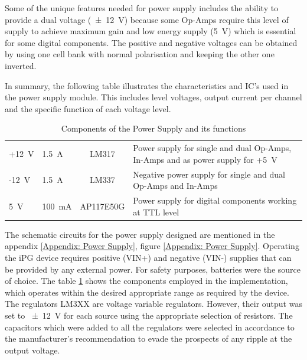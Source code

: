 Some of the unique features needed for power supply includes the ability to provide a dual voltage (\SI{\pm 12}{\volt}) because some Op-Amps require this level of supply to achieve maximum gain and low energy supply (\SI{5}{\volt}) which is essential for some digital components. The positive and negative voltages can be obtained by using one cell bank with normal polarisation and keeping the other one inverted. 

In summary, the following table illustrates the characteristics and IC's used in the power supply module. This includes level voltages, output current per channel and the specific function of each voltage level. 

\begin{table}[!htpb]
	\caption{Components of the Power Supply and its functions}
	\centering
	\label{table:power supply details}
	\begin{tabular}{p{2 cm} p{2 cm} c p{6 cm}}
		\toprule
		\centering{\textbf{Voltage supply}} & \centering{\textbf{Current supply}} & \centering{\textbf{IC}} & \centering{\textbf{Function}} \tabularnewline \midrule
		+\SI{12}{\volt} & \SI{1.5}{\ampere} & LM317 & Power supply for single and dual Op-Amps, In-Amps and as power supply for +\SI{5}{\volt} \tabularnewline \midrule 
		-\SI{12}{\volt} & \SI{1.5}{\ampere} & LM337 & Negative power supply for single and dual Op-Amps and In-Amps \tabularnewline \midrule 
		\SI{5}{\volt} & \SI{100}{\milli\ampere} & AP117E50G & Power supply for digital components working at TTL level \tabularnewline \bottomrule 
	\end{tabular}
\end{table}

The schematic circuits for the power supply designed are mentioned in the appendix \ref{Appendix: Power Supply}, figure \ref{Appendix: Power Supply}. Operating the iPG device requires positive (VIN+) and negative (VIN-) supplies that can be provided by any external power. For safety purposes, batteries were the source of choice. The table \ref{table:power supply details} shows the components employed in the implementation, which operates within the desired appropriate range as required by the device. The regulators LM3XX are voltage variable regulators. However, their output was set to \SI{\pm 12}{\volt} for each source using the appropriate selection of resistors. The capacitors which were added to all the regulators were selected in accordance to the manufacturer's recommendation to evade the prospects of any ripple at the output voltage.

